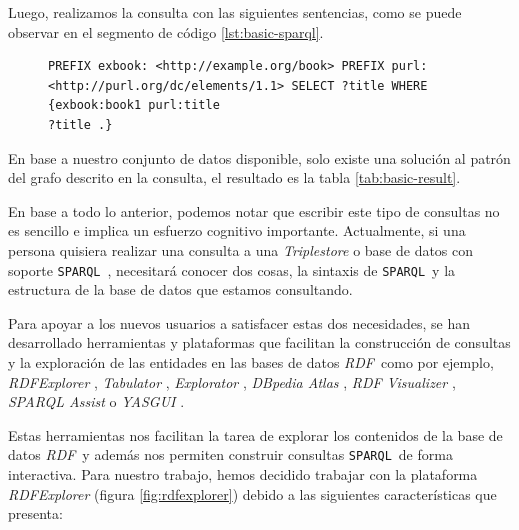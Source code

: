 \documentclass[conference,compsoc]{IEEEtran}
\newcommand{\rdf}{\textit{RDF}\ } \newcommand{\spql}{\texttt{SPARQL}\ }
\begin{document}
Luego, realizamos la consulta con las siguientes sentencias, como se puede
observar en el segmento de código \ref{lst:basic-sparql}.

\begin{figure}
    \begin{lstlisting}[captionpos=b, caption=Consulta SPARQL basica., label=lst:basic-sparql, basicstyle=\ttfamily, frame=single]
PREFIX exbook: <http://example.org/book> PREFIX purl:
<http://purl.org/dc/elements/1.1> SELECT ?title WHERE {exbook:book1 purl:title
?title .}
     \end{lstlisting}
\end{figure}

En base a nuestro conjunto de datos disponible, solo existe una solución al
patrón del grafo descrito en la consulta, el resultado es la tabla
\ref{tab:basic-result}.

\begin{table}[h]
    \label{tab:basic-result}
    \caption{Resultado de una consulta SPARQL básica}
    \centering
\end{table}

En base a todo lo anterior, podemos notar que escribir este tipo de consultas no
es sencillo e implica un esfuerzo cognitivo importante. Actualmente, si una
persona quisiera realizar una consulta a una \textit{Triplestore} o base de
datos con soporte \spql, necesitará conocer dos cosas, la sintaxis de \spql y la
estructura de la base de datos que estamos consultando.

Para apoyar a los nuevos usuarios a satisfacer estas dos necesidades, se han
desarrollado herramientas y plataformas que facilitan la construcción de
consultas y la exploración de las entidades en las bases de datos \rdf como por
ejemplo, \textit{RDFExplorer} \cite{vargas2019rdf}, \textit{Tabulator}
\cite{berners2006tabulator} , \textit{Explorator}
\cite{araujo2009experimenting}, \textit{DBpedia Atlas}
\cite{valsecchi2015dbpedia}, \textit{RDF Visualizer} \cite{sayers2004node},
\textit{SPARQL Assist} \cite{mccarthy2012sparql} o \textit{YASGUI}
\cite{rietveld2017yasgui}.

Estas herramientas nos facilitan la tarea de explorar los contenidos de la base
de datos \rdf y además nos permiten construir consultas \spql de forma
interactiva. Para nuestro trabajo, hemos decidido trabajar con la plataforma
\textit{RDFExplorer} (figura \ref{fig:rdfexplorer}) debido a las siguientes
características que presenta:
\end{document}
